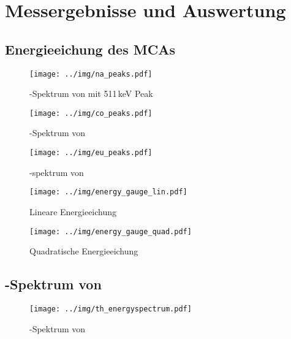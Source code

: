 \section{Messergebnisse und Auswertung}

\subsection{Energieeichung des MCAs}
\begin{figure}[H]
\begin{center}
  \texttt{[image: ../img/na\_peaks.pdf]}
  \caption{\textgamma-Spektrum von  mit 511\,keV Peak}
  \label{img:na:peak}
\end{center}
\end{figure}

\begin{figure}[H]
\begin{center}
  \texttt{[image: ../img/co\_peaks.pdf]}
  \caption{\textgamma-Spektrum von }
  \label{img:co:peak}
\end{center}
\end{figure}

\begin{figure}[H]
\begin{center}
  \texttt{[image: ../img/eu\_peaks.pdf]}
  \caption{\textgamma-spektrum von }
  \label{img:eu:peak}
\end{center}
\end{figure}

\begin{figure}[H]
\begin{center}
  \texttt{[image: ../img/energy\_gauge\_lin.pdf]}
  \caption{Lineare Energieeichung}
  \label{img:gauge:lin}
\end{center}
\end{figure}

\begin{figure}[H]
\begin{center}
  \texttt{[image: ../img/energy\_gauge\_quad.pdf]}
  \caption{Quadratische Energieeichung}
  \label{img:gauge:lin}
\end{center}
\end{figure}

\subsection{\textgamma-Spektrum von }
\begin{figure}[H]
\begin{center}
  \texttt{[image: ../img/th\_energyspectrum.pdf]}
  \caption{\textgamma-Spektrum von }
  \label{img:th:spectrum}
\end{center}
\end{figure}

